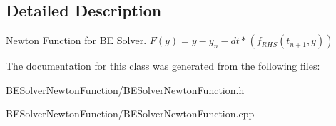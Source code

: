 \subsection{Detailed Description}
Newton Function for BE Solver. $ F(y) = y - y_{n} - dt*(f_{RHS}(t_{n+1},y)) $ 

The documentation for this class was generated from the following files:\begin{DoxyCompactItemize}
\item 
BESolverNewtonFunction/BESolverNewtonFunction.h\item 
BESolverNewtonFunction/BESolverNewtonFunction.cpp\end{DoxyCompactItemize}
